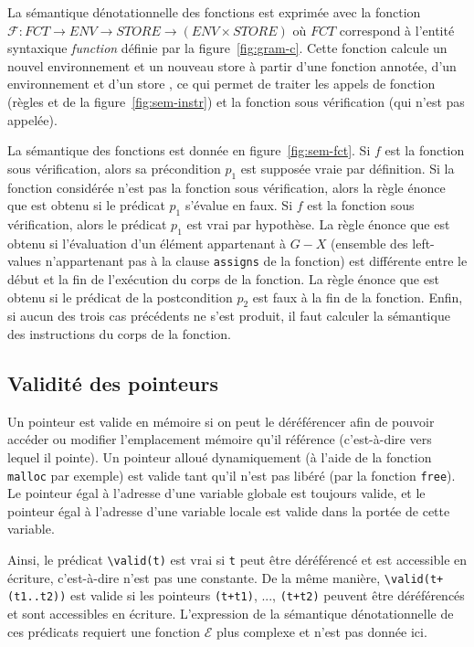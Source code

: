 


La sémantique dénotationnelle des fonctions est exprimée avec la fonction
$\mathcal{F} : FCT \rightarrow ENV \rightarrow STORE \rightarrow (ENV \times STORE)$ où $FCT$ correspond à
l'entité syntaxique \textit{function} définie par la figure~\ref{fig:gram-c}.
Cette fonction calcule un nouvel environnement et un nouveau store à partir
d'une fonction annotée, d'un environnement \env{} et d'un store \store, ce qui
permet de traiter les appels de fonction (règles  et
 de la figure~\ref{fig:sem-instr}) et la fonction sous
vérification (qui n'est pas appelée).

La sémantique des fonctions est donnée en figure~\ref{fig:sem-fct}.
Si $f$ est la fonction sous vérification, alors sa
précondition $p_1$ est supposée vraie par définition.
Si la fonction considérée n'est pas la fonction sous vérification, alors la
règle  énonce que \errorenv est obtenu si le prédicat
$p_1$ s'évalue en faux.
Si $f$ est la fonction sous vérification, alors le prédicat
$p_1$ est vrai par hypothèse.
La règle  énonce que \errorenv est obtenu si l'évaluation
d'un élément appartenant à $G-X$ (ensemble des left-values n'appartenant pas à
la clause \lstinline'assigns' de la fonction) est différente entre le début
et la fin de l'exécution du corps de la fonction.
La règle  énonce que \errorenv est obtenu si le prédicat de la
postcondition $p_2$ est faux à la fin de la fonction.
Enfin, si aucun des trois cas précédents ne s'est produit, il faut calculer la
sémantique des instructions du corps de la fonction.


\subsection{Validité des pointeurs}
\label{sec:ptr-valid}

Un pointeur est valide en mémoire si on peut le déréférencer afin de pouvoir
accéder ou modifier l'emplacement mémoire qu'il référence (c'est-à-dire vers
lequel il pointe).
Un pointeur alloué dynamiquement (à l'aide de la fonction \lstinline'malloc' par
exemple) est valide tant qu'il n'est pas libéré (par la fonction
\lstinline'free').
Le pointeur égal à l'adresse d'une variable globale est toujours valide, et le
pointeur égal à l'adresse d'une variable locale est valide dans la portée de
cette variable.

Ainsi, le prédicat \lstinline'\valid(t)' est vrai si \lstinline't'
peut être déréférencé et est accessible en écriture, c'est-à-dire n'est pas une
constante.
De la même manière, \lstinline'\valid(t+(t1..t2))' est valide si les pointeurs
\lstinline'(t+t1)', ..., \lstinline'(t+t2)' peuvent être déréférencés et sont
accessibles en écriture.
L'expression de la sémantique dénotationnelle de ces prédicats requiert une
fonction $\mathcal{E}$ plus complexe et n'est pas donnée ici.


